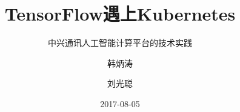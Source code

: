 \title[TensorFlow on Kubernetes]
{TensorFlow遇上Kubernetes}

\subtitle{中兴通讯人工智能计算平台的技术实践}

\author[刘光聪,韩炳涛]
{ 韩炳涛 \and 刘光聪 
}


\date[2017.08]{2017-08-05}
